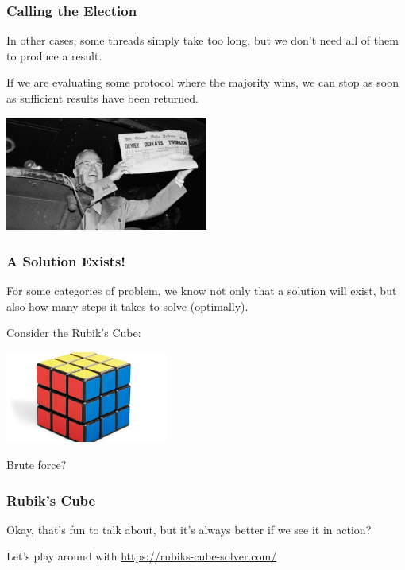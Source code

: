 \begin{frame}
\frametitle{Calling the Election}

In other cases, some threads simply take too long, but we don't need all of them to produce a result. 

If we are evaluating some protocol where the majority wins, we can stop as soon as sufficient results have been returned.

\begin{center}
	\includegraphics[width=0.5\textwidth]{images/dewey.jpg}
\end{center}


\end{frame}


\begin{frame}
\frametitle{A Solution Exists!}

For some categories of problem, we know not only that a solution will exist, but also how many steps it takes to solve (optimally). 

Consider the Rubik's Cube:

\begin{center}
	\includegraphics[width=0.4\textwidth]{images/rubikscube.jpg}
\end{center}

Brute force?

\end{frame}


\begin{frame}
\frametitle{Rubik's Cube}

Okay, that's fun to talk about, but it's always better if we see it in action? 

Let's play around with \url{https://rubiks-cube-solver.com/}

\end{frame}



